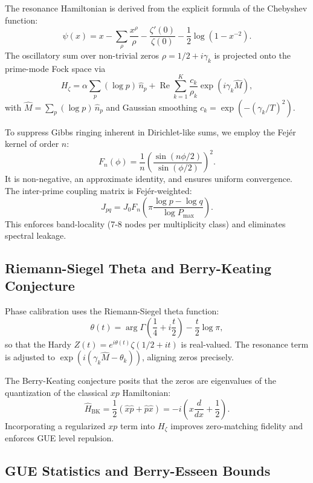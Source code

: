 \documentclass[11pt,a4paper]{article}
\theoremstyle{definition}
\theoremstyle{remark}
\begin{document}
The resonance Hamiltonian is derived from the explicit formula of the Chebyshev function:
\[
\psi(x) = x - \sum_{\rho} \frac{x^\rho}{\rho} - \frac{\zeta'(0)}{\zeta(0)} - \frac{1}{2}\log(1-x^{-2}).
\]
The oscillatory sum over non-trivial zeros $\rho = 1/2 + i\gamma_k$ is projected onto the prime-mode Fock space via
\begin{equation}
    H_\zeta = \alpha \sum_p (\log p)\, \hat{n}_p + \operatorname{Re}\sum_{k=1}^{K} \frac{c_k}{\rho_k} \exp(i\gamma_k \hat{M}),
\end{equation}
with $\hat{M} = \sum_p (\log p)\,\hat{n}_p$ and Gaussian smoothing $c_k = \exp(-(\gamma_k/T)^2)$.

To suppress Gibbs ringing inherent in Dirichlet-like sums, we employ the Fejér kernel of order $n$:
\[
F_n(\phi) = \frac{1}{n}\left(\frac{\sin(n\phi/2)}{\sin(\phi/2)}\right)^2.
\]
It is non-negative, an approximate identity, and ensures uniform convergence. The inter-prime coupling matrix is Fejér-weighted:
\[
J_{pq} = J_0 F_n\!\left(\pi\frac{\log p - \log q}{\log P_{\max}}\right).
\]
This enforces band-locality (7-8 nodes per multiplicity class) and eliminates spectral leakage.

\subsection{Riemann-Siegel Theta and Berry-Keating Conjecture}
\label{subsec:theta_bk}

Phase calibration uses the Riemann-Siegel theta function:
\[
\theta(t) = \arg\Gamma\!\left(\frac{1}{4} + i\frac{t}{2}\right) - \frac{t}{2}\log\pi,
\]
so that the Hardy $Z(t) = e^{i\theta(t)}\zeta(1/2+it)$ is real-valued. The resonance term is adjusted to $\exp(i(\gamma_k \hat{M} - \theta_k))$, aligning zeros precisely.

The Berry-Keating conjecture posits that the zeros are eigenvalues of the quantization of the classical $xp$ Hamiltonian:
\[
\hat{H}_{\text{BK}} = \frac{1}{2}(\hat{x}\hat{p} + \hat{p}\hat{x}) = -i\left(x\frac{d}{dx} + \frac{1}{2}\right).
\]
Incorporating a regularized $xp$ term into $H_\zeta$ improves zero-matching fidelity and enforces GUE level repulsion.

\subsection{GUE Statistics and Berry-Esseen Bounds}
\label{subsec:gue}
\end{document}
